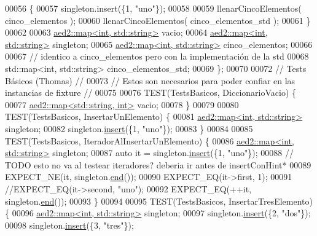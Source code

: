\begin{DoxyCode}
00056     \{
00057         singleton.insert(\{1, \textcolor{stringliteral}{"uno"}\});
00058 
00059         llenarCincoElementos( cinco\_elementos );
00060         llenarCincoElementos( cinco\_elementos\_std );
00061     \}
00062 
00063     \hyperlink{classaed2_1_1map}{aed2::map<int, std::string>} vacio;
00064     \hyperlink{classaed2_1_1map}{aed2::map<int, std::string>} singleton;
00065     \hyperlink{classaed2_1_1map}{aed2::map<int, std::string>} cinco\_elementos;
00066 
00067     \textcolor{comment}{// identico a cinco\_elementos pero con la implementación de la std}
00068     std::map<int, std::string> cinco\_elementos\_std;
00069 \};
00070 
00072 \textcolor{comment}{// Tests Básicos (Thomas)                                               //}
00073 \textcolor{comment}{// Estos son necesarios para poder confiar en las instancias de fixture //}
00075 \textcolor{comment}{}
00076 TEST(TestsBasicos, DiccionarioVacio) \{
00077     \hyperlink{classaed2_1_1map}{aed2::map<std::string, int>} vacio;
00078 \}
00079 
00080 TEST(TestsBasicos, InsertarUnElemento) \{
00081     \hyperlink{classaed2_1_1map}{aed2::map<int, std::string>} singleton;
00082     singleton.\hyperlink{classaed2_1_1map_a6941cde9a79c27f054b5c97a587a1854_a6941cde9a79c27f054b5c97a587a1854}{insert}(\{1, \textcolor{stringliteral}{"uno"}\});
00083 \}
00084 
00085 TEST(TestsBasicos, IteradorAlInsertarUnElemento) \{
00086     \hyperlink{classaed2_1_1map}{aed2::map<int, std::string>} singleton;
00087     \textcolor{keyword}{auto} it = singleton.\hyperlink{classaed2_1_1map_a6941cde9a79c27f054b5c97a587a1854_a6941cde9a79c27f054b5c97a587a1854}{insert}(\{1, \textcolor{stringliteral}{"uno"}\});
00088     \textcolor{comment}{// TODO esto no va al testear iteradores? deberia ir antes de insertConHint*}
00089     EXPECT\_NE(it, singleton.\hyperlink{classaed2_1_1map_a76023e6a56cb625513e1b5ea028bf983_a76023e6a56cb625513e1b5ea028bf983}{end}());
00090     EXPECT\_EQ(it->first, 1);
00091     \textcolor{comment}{//EXPECT\_EQ(it->second, "uno");}
00092     EXPECT\_EQ(++it, singleton.\hyperlink{classaed2_1_1map_a76023e6a56cb625513e1b5ea028bf983_a76023e6a56cb625513e1b5ea028bf983}{end}());
00093 \}
00094 
00095 TEST(TestsBasicos, InsertarTresElemento) \{
00096     \hyperlink{classaed2_1_1map}{aed2::map<int, std::string>} singleton;
00097     singleton.\hyperlink{classaed2_1_1map_a6941cde9a79c27f054b5c97a587a1854_a6941cde9a79c27f054b5c97a587a1854}{insert}(\{2, \textcolor{stringliteral}{"dos"}\});
00098     singleton.\hyperlink{classaed2_1_1map_a6941cde9a79c27f054b5c97a587a1854_a6941cde9a79c27f054b5c97a587a1854}{insert}(\{3, \textcolor{stringliteral}{"tres"}\});

\end{DoxyCode}
